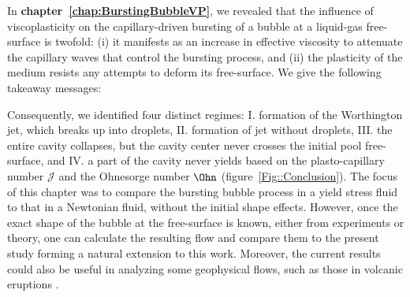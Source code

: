 In \textbf{chapter~\ref{chap:BurstingBubbleVP}}, we revealed that the influence of viscoplasticity on the capillary-driven bursting of a bubble at a liquid-gas free-surface is twofold: (i) it manifests as an increase in effective viscosity to attenuate the capillary waves that control the bursting process, and (ii) the plasticity of the medium resists any attempts to deform its free-surface. We give the following takeaway messages:\vspace{2mm}

\vspace{2mm}

Consequently, we identified four distinct regimes: I. formation of the Worthington jet, which breaks up into droplets, II. formation of jet without droplets, III. the entire cavity collapses, but the cavity center never crosses the initial pool free-surface, and IV. a part of the cavity never yields based on the plasto-capillary number $\mathcal{J}$ and the Ohnesorge number $\Ohn$ (figure~\ref{Fig::Conclusion}). The focus of this chapter was to compare the bursting bubble process in a yield stress fluid to that in a Newtonian fluid, without the initial shape effects. However, once the exact shape of the bubble at the free-surface is known, either from experiments or theory, one can calculate the resulting flow and compare them to the present study forming a natural extension to this work. Moreover, the current results could also be useful in analyzing some geophysical flows, such as those in volcanic eruptions \cite{gonnermann2007fluid}.

